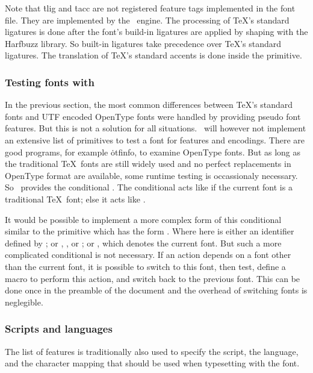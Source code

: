 \item Note that \.{tlig} and \.{tacc} are not registered feature tags implemented in
the font file. They are implemented by the \HiTeX\ engine.
The processing of \TeX's standard ligatures is done after the font's build-in
ligatures are applied by shaping with the Harfbuzz library.
So built-in ligatures take precedence over \TeX's standard ligatures.
The translation of \TeX's standard accents is done inside the  primitive.
\enditemize

\subsubsection{Testing fonts with }
In the previous section, the most common differences between \TeX's standard
fonts and UTF encoded OpenType fonts were handled by providing pseudo font features.
But this is not a solution for all situations.
\HiTeX\ will however not implement an extensive list of primitives to test a font
for features and encodings. There are good programs, for example \.{otfinfo},
to examine OpenType fonts. But as long as the traditional \TeX\ fonts are still
widely used and no perfect replacements in OpenType format are available,
some runtime testing is occassionaly necessary. So \HiTeX\ provides the conditional
.
The conditional acts like  if the current font is a traditional \TeX\ font;
else it acts like .

It would be possible to implement a more complex form of this conditional
similar to the  primitive
which has the form . Where  here
is either an identifier defined by ; or ,
, or ; or , 
which denotes the current font. But such a more complicated conditional is not
necessary. If an action depends on a font other than the current font, it is possible
to switch to this font, then test, define a macro to perform this action,
and switch back to the previous font. This can be done once in the preamble of the
document and the overhead of switching fonts is neglegible. 

\subsubsection{Scripts and languages}
The list of features is traditionally also used to specify the script, the language,
and the character mapping that should be used when typesetting with the font.

